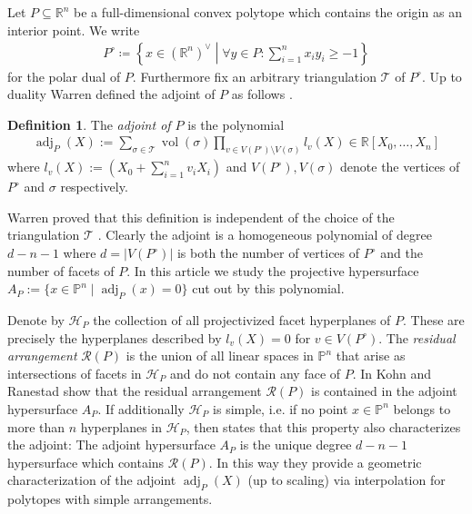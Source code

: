 \documentclass[a4paper,10pt]{amsart}
\theoremstyle{definition}
\newtheorem{defin}{Definition}[section]
\theoremstyle{plain}
\newcommand{\adj}{\operatorname{adj}} %
\newcommand{\vol}{\operatorname{vol}}
\newcommand{\cH}{{\mathcal H}}
\newcommand{\cR}{{\mathcal R}}
\newcommand{\cT}{{\mathcal T}}
\newcommand{\R}{{\mathbb R}}
\newcommand{\pp}{\mathbb{P}}
\begin{document}
Let $P\subseteq \R^n$ be a full-dimensional convex polytope which contains the origin as an interior point. We write \begin{align}
\label{eq:polar_dual}
    P^\circ \coloneqq \left\{x\in (\R^n)^\vee\middle| \forall y \in P: \sum_{i=1}^nx_iy_i\geq -1\right\}
\end{align}
for the polar dual of $P$. Furthermore fix an arbitrary triangulation $\cT$ of $P^\circ$. Up to duality Warren defined the adjoint of $P$ as follows \cite{Warren1996Adjoints}.
\begin{defin}
    The \emph{adjoint of $P$} is the polynomial \begin{align*}
        \adj_P(X):=\sum_{\sigma\in \cT}\vol(\sigma)\prod_{v\in V(P^\circ)\setminus V(\sigma)}l_v(X)\in \R[X_0,\ldots,X_n]
    \end{align*}
    where $l_v(X):=\left(X_0+\sum_{i=1}^nv_iX_i\right)$ and $V(P^\circ),V(\sigma)$ denote the vertices of $P^\circ$ and $\sigma$ respectively.
\end{defin}
Warren proved that this definition is independent of the choice of the triangulation $\cT$ \cite[Theorem 4]{Warren1996Adjoints}.
Clearly the adjoint is a homogeneous polynomial of degree $d-n-1$ where $d=|V(P^\circ)|$ is both the number of vertices of $P^\circ$ and the number of facets of $P$. In this article we study the projective hypersurface $A_P:=\{x\in \pp^n\mid \adj_P(x)=0\}$ cut out by this polynomial.

Denote by $\cH_P$ the collection of all projectivized facet hyperplanes of $P$. These are precisely the hyperplanes described by $l_v(X)=0$ for $v\in V(P^\circ)$. The \emph{residual arrangement} $\cR(P)$ is the union of all linear spaces in $\pp^n$ that arise as intersections of facets in $\cH_P$ and do not contain any face of $P$. In \cite[Proposition 2]{KohnRanestad2019AdjCurves} Kohn and Ranestad show that the residual arrangement $\cR(P)$ is contained in the adjoint hypersurface $A_P$. If additionally $\cH_P$ is simple, i.e. if no point $x \in \pp^n$ belongs to more than $n$ hyperplanes in $\cH_P$, then \cite[Theorem 1]{KohnRanestad2019AdjCurves} states that this property also characterizes the adjoint:
The adjoint hypersurface $A_P$ is the unique degree $d-n-1$ hypersurface which contains $\cR(P)$. In this way they provide a geometric characterization of the adjoint $\adj_P(X)$ (up to scaling) via interpolation for polytopes with simple arrangements.  
\end{document}

